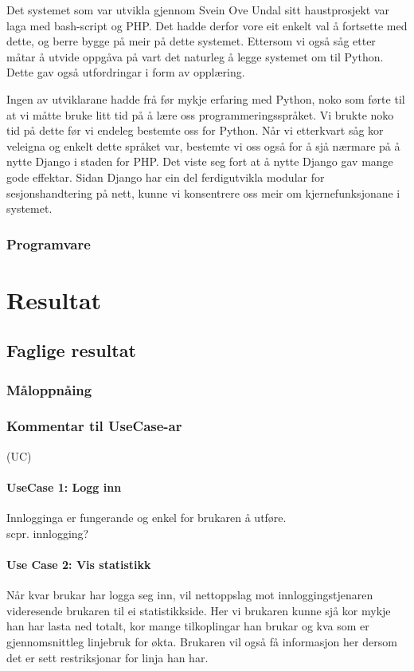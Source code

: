 \documentclass[nynorsk,12pt,a4paper,oneside]{book}
\begin{document}
Det systemet som var utvikla gjennom Svein Ove Undal sitt haustprosjekt var laga med bash-script og PHP. Det hadde derfor vore eit enkelt val å fortsette med dette, og berre bygge på meir på dette systemet. Ettersom vi også såg etter måtar å utvide oppgåva på vart det naturleg å legge systemet om til Python. Dette gav også utfordringar i form av opplæring.

Ingen av utviklarane hadde frå før mykje erfaring med Python, noko som førte til at vi måtte bruke litt tid på å lære oss programmeringsspråket. Vi brukte noko tid på dette før vi endeleg bestemte oss for Python. Når vi etterkvart såg kor veleigna og enkelt dette språket var, bestemte vi oss også for å sjå nærmare på å nytte Django i staden for PHP. Det viste seg fort at å nytte Django gav mange gode effektar. Sidan Django har ein del ferdigutvikla modular for sesjonshandtering på nett, kunne vi konsentrere oss meir om kjernefunksjonane i systemet.

\subsection{Programvare}


\chapter{Resultat}

\section{Faglige resultat}
\subsection{Måloppnåing}
	
\subsection{Kommentar til UseCase-ar}
(UC)
\subsubsection{UseCase 1: Logg inn}
Innlogginga er fungerande og enkel for brukaren å utføre. \\
scpr. innlogging?

\subsubsection{Use Case 2: Vis statistikk}
Når kvar brukar har logga seg inn, vil nettoppslag mot innloggingstjenaren videresende brukaren til ei statistikkside. Her vi brukaren kunne sjå kor mykje han har lasta ned totalt, kor mange tilkoplingar han brukar og kva som er gjennomsnittleg linjebruk for økta. Brukaren vil også få informasjon her dersom det er sett restriksjonar for linja han har.
\end{document}

